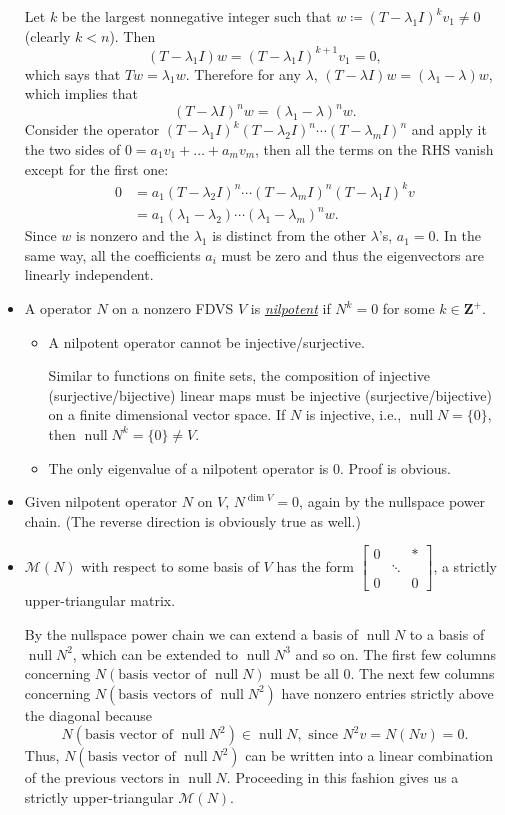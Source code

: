 \documentclass[11pt]{article}
\newcommand{\df}[1]{\ul{\textit{\textsf{#1}}}}
\newcommand{\Z}{\mathbf{Z}}
\newcommand{\n}{\operatorname{null}}
\renewcommand{\d}{\dim}
\newcommand{\M}{\mathcal{M}}
\begin{document}
\begin{itemize}
    Let $k$ be the largest nonnegative integer such that $w \coloneqq (T-\lambda_1 I)^k v_1 \not= 0$ (clearly $k < n$). Then $$(T - \lambda_1 I)w = (T - \lambda_1 I)^{k+1} v_1 = 0,$$ which says that $Tw = \lambda_1 w$. Therefore for any $\lambda$, $(T-\lambda I) w = (\lambda_1 - \lambda) w$, which implies that $$(T-\lambda I)^n w = (\lambda_1 - \lambda)^n w.$$ Consider the operator $(T-\lambda_1 I)^k (T-\lambda_2 I)^n \cdots (T-\lambda_m I)^n$ and apply it the two sides of $0 = a_1v_1 + \dots + a_mv_m$, then all the terms on the RHS vanish except for the first one:
    \begin{align*}
    0 & = a_1 (T-\lambda_2 I)^n \cdots (T-\lambda_m I)^n (T-\lambda_1 I)^k v \\ & = a_1 (\lambda_1 -\lambda_2) \cdots (\lambda_1 - \lambda_m)^n w.
    \end{align*}
    Since $w$ is nonzero and the $\lambda_1$ is distinct from the other $\lambda$'s, $a_1 = 0$. In the same way, all the coefficients $a_i$ must be zero and thus the eigenvectors are linearly independent.
	\item A operator $N$ on a nonzero FDVS $V$ is \df{nilpotent} if $N^k = 0$ for some $k \in \Z^+$.
	\begin{itemize}
        \item A nilpotent operator cannot be injective/surjective.
        
        Similar to functions on finite sets, the composition of injective (surjective/bijective) linear maps must be injective (surjective/bijective) on a finite dimensional vector space. If $N$ is injective, i.e., $\n N = \{0\}$, then $\n N^k = \{0\} \neq V$.
	\item The only eigenvalue of a nilpotent operator is 0. Proof is obvious.
	\end{itemize}
	\item Given nilpotent operator $N$ on $V$, $N^{\d V} = 0$, again by the nullspace power chain. (The reverse direction is obviously true as well.)
	\item $\M(N)$ with respect to some basis of $V$ has the form $	\begin{bmatrix}
		0 & & \ast \\
		 & \ddots & \\
		 0 & & 0
	\end{bmatrix}$,
    a strictly upper-triangular matrix.
	
    By the nullspace power chain we can extend a basis of $\n N$ to a basis of $\n N^2$, which can be extended to $\n N^3$ and so on.
    The first few columns concerning $N(\text{basis vector of } \n N)$ must be all 0. The next few columns concerning $N(\text{basis vectors of } \n N^2)$ have nonzero entries strictly above the diagonal because $$N(\text{basis vector of } \n N^2) \in \n N, \text{ since }N^2v = N(Nv) = 0.$$ Thus, $N(\text{basis vector of } \n N^2)$ can be written into a linear combination of the previous vectors in $\n N$. Proceeding in this fashion gives us a strictly upper-triangular $\M(N)$.
\end{itemize}
\end{document}
